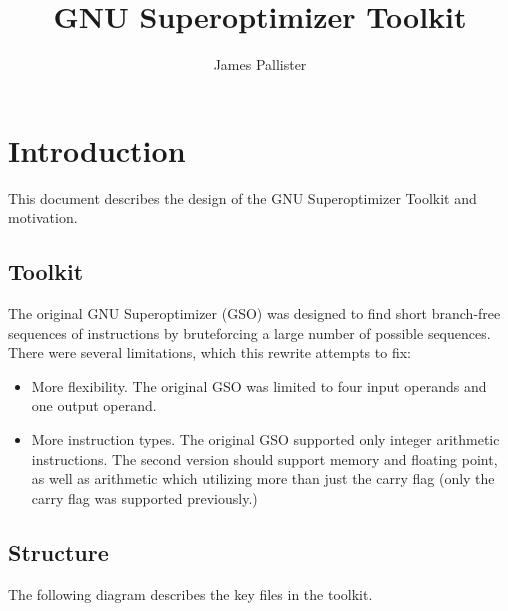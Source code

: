 \documentclass{article}
\begin{document}
\title{GNU Superoptimizer Toolkit}
\author{James Pallister}

\maketitle

\section{Introduction}

This document describes the design of the GNU Superoptimizer Toolkit and motivation.

\subsection{Toolkit}

The original GNU Superoptimizer (GSO) was designed to find short branch-free sequences of instructions by bruteforcing a large number of possible sequences. There were several limitations, which this rewrite attempts to fix:

\begin{itemize}
    \item More flexibility. The original GSO was limited to four input operands and one output operand.
    \item More instruction types. The original GSO supported only integer arithmetic instructions. The second version should support memory and floating point, as well as arithmetic which utilizing more than just the carry flag (only the carry flag was supported previously.)
\end{itemize}

\subsection{Structure}

The following diagram describes the key files in the toolkit.
\end{document}
